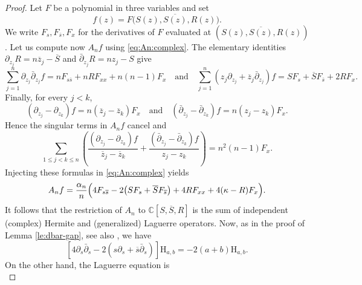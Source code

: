 \documentclass[11pt,reqno]{amsart}
\numberwithin{equation}{section}%
\numberwithin{figure}{section}%
\numberwithin{table}{section}
\theoremstyle{plain}
\theoremstyle{definition}
\begin{document}
\begin{proof}
  Let $F$ be a polynomial in three variables and set
  \begin{equation}
    f(z)=F\bigl(S(z),\overline{S(z)},R(z)\bigr).
  \end{equation}
  We write $F_s,F_{\overline s},F_x$ for the derivatives of $F$ evaluated at
  $(S(z),\overline{S(z)},R(z))$. Let us compute now $A_nf$ using
  \eqref{eq:An:complex}. The elementary identities
  $\partial_{z_j}R=n\overline z_j-\overline S$ and
  $\bar\partial_{z_j}R=nz_j-S$ give
  \begin{equation}
    \sum_{j=1}^n\partial_{z_j}\bar\partial_{z_j}f
    =nF_{s\overline s}+nR F_{xx}+n(n-1)F_x
    \quad\text{and}\quad
    \sum_{j=1}^n
    \left(z_j\partial_{z_j}+\overline z_j\bar\partial_{z_j}\right)f
    =SF_s+\overline S F_{\overline s}+2R F_x.
  \end{equation}
  Finally, for every $j<k$,
  \begin{equation}
    (\partial_{z_j}-\partial_{z_k})f
    =n(\overline z_j-\overline z_k)F_x
    \quad\text{and}\quad
    (\bar\partial_{z_j}-\bar\partial_{z_k})f
    =n(z_j-z_k)F_x.
  \end{equation}
  Hence the singular terms in $A_nf$ cancel and
  \begin{equation}\label{eq:interaction-computation}
    \sum_{1\leq j<k\leq n}
    \left(
      \frac{(\partial_{z_j}-\partial_{z_k})f}
      {\overline z_j-\overline z_k}
      +
      \frac{(\bar\partial_{z_j}-\bar\partial_{z_k})f}
      {z_j-z_k}
    \right)
    =n^2(n-1)F_x.
  \end{equation}
  Injecting these formulas in \eqref{eq:An:complex} yields
  \begin{equation}\label{eq:restricted-generator}
    A_n f = \frac{\alpha_n}{n}\Bigl(
    4F_{s\overline s} -2\bigl(SF_s +\overline S F_{\overline s}\bigr) +4R F_{xx}+4(\kappa-R)F_x\Bigr).
  \end{equation}
  It follows that the restriction of $A_n$ to $\mathbb C[S,\overline S,R]$ is
  the sum of independent (complex) Hermite and (generalized) Laguerre
  operators. Now, as in the proof of Lemma \ref{le:dbar-gap}, see also
  \cite{Ito}, we have
  \begin{equation}\label{eq:hermite-equation}
    \left[
      4\partial_s\bar\partial_s
      -2\left(s\partial_s+\overline s\bar\partial_s\right)
    \right]\mathrm H_{a,b}
    =-2(a+b)\mathrm H_{a,b}.
  \end{equation}
  On the other hand, the Laguerre equation is
  \begin{equation}\label{eq:laguerre}

\end{equation}
\end{proof}
\end{document}
